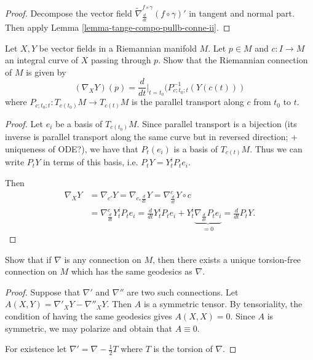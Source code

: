 \begin{proof}
Decompose the vector field
$\tilde{\nabla}^{f\circ\gamma}_{\frac{d}
{dt}}(f\circ\gamma)'$
in tangent and
normal part. Then apply Lemma
\ref{lemma-tange-compo-pullb-conne-ii}.
\end{proof}

\begin{exercise}
\label{exercise-paral-trans-deter-conne}
\begin{reference}
\cite[Chapter II, Exercise 2]{doc}
\end{reference}
Let $X,Y$ be vector fields in a Riemannian
manifold $M$.
Let $p \in M$ and $c:I \to M$ an integral
curve of $X$ passing through $p$.
Show that the Riemannian connection of $M$ is
given by
$$
(\nabla_XY)(p)
=\frac{d}{dt}\Big|_{t=t_0}
(P^{-1}_{c;t_0;t}(Y(c(t)))
$$
where $P_{c;t_0;t}:T_{c(t_0)}M \to T_{c(t)}M$
is the parallel transport along $c$ from
$t_0$ to $t$.
\end{exercise}

\begin{proof}
Let $e_i$ be a basis of $T_{c(t_0)}M$.
Since parallel transport is a bijection
(its inverse is parallel transport
along the same curve but in reversed
direction;
+ uniqueness of ODE?),
we have that $P_t(e_i)$ is a basis of
$T_{c(t)}M$.
Thus we can write $P_tY$ in terms of this
basis, i.e.
$P_tY = Y^i_tP_te_i$.

Then
$$
\begin{aligned}
\nabla_XY&=\nabla_{c'}Y=\nabla_{c_*\frac{d}
{dt}}Y
=\nabla_{\frac{d}{dt}}^{c}Y \circ c\\
&=\nabla^c_{\frac{d}{dt}}Y^i_tP_te_i
=\frac{d}{dt}Y^i_tP_te_i+
Y^i_t\underbrace{\nabla_{\frac{d}{dt}}P_te_i}
_{=0}
=\frac{d}{dt}P_tY.
\end{aligned}
$$
\end{proof}

\begin{exercise}
\label{exercise-unique-connection-torsion}
Show that if $\nabla$ is any connection
on $M$, then there exists a unique
torsion-free connection on $M$
which has the same geodesics as $\nabla$.
\end{exercise}

\begin{proof}
Suppose that $\nabla'$  and $\nabla''$
are two such connections. Let
$A(X,Y)=\nabla'_XY-\nabla''_XY$.
Then $A$ is a symmetric tensor.
By tensoriality, the condition of
having the same geodesics gives $A(X,X)=0$.
Since $A$ is symmetric, we may polarize
and obtain that $A \equiv 0$.

For existence let
$\nabla'=\nabla-\frac{1}{2}T$
where $T$ is the torsion of $\nabla$.
\end{proof}

